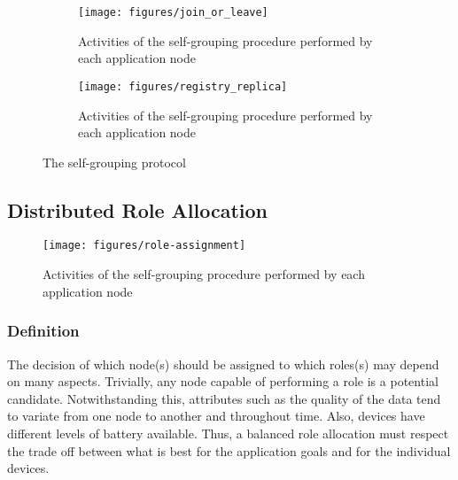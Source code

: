 \begin{figure}[t!]
	\centering
	\begin{subfigure}[b]{0.45\textwidth}
		\centering
		\texttt{[image: figures/join\_or\_leave]}
		\caption{Activities of the self-grouping procedure performed by each application node}
		\label{fig:join_or_leave}
	\end{subfigure}%
	
	\begin{subfigure}[b]{0.45\textwidth}
		\centering
		\texttt{[image: figures/registry\_replica]}
		\caption{Activities of the self-grouping procedure performed by each application node}
		\label{fig:registry_replica}
	\end{subfigure}
	\caption{The self-grouping protocol}
	\label{fig:self_grouping}
\end{figure}




 
\subsection{Distributed Role Allocation} 
 
\begin{figure}[t!]
	\centering
	\texttt{[image: figures/role-assignment]}
	\caption{Activities of the self-grouping procedure performed by each application node}
	\label{fig:self_grouping}
\end{figure}
 
\subsubsection{\textbf{Definition}} The decision of which node(s) should be assigned to which roles(s) may depend on many aspects. Trivially, any node capable of performing a role is a potential candidate. Notwithstanding this, attributes such as the quality of the data tend to variate from one node to another and throughout time. Also, devices have different levels of battery available. Thus, a balanced role allocation must respect the trade off between what is best for the application goals and for the individual devices. 

